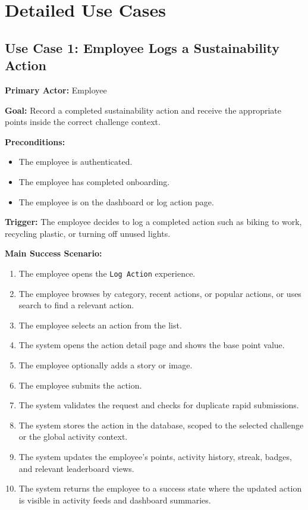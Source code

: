 \documentclass[12pt]{article}
\begin{document}
\section{Detailed Use Cases}

\subsection{Use Case 1: Employee Logs a Sustainability Action}

\textbf{Primary Actor:} Employee

\textbf{Goal:} Record a completed sustainability action and receive the
appropriate points inside the correct challenge context.

\textbf{Preconditions:}
\begin{itemize}[leftmargin=1.5em]
    \item The employee is authenticated.
    \item The employee has completed onboarding.
    \item The employee is on the dashboard or log action page.
\end{itemize}

\textbf{Trigger:} The employee decides to log a completed action such as biking
to work, recycling plastic, or turning off unused lights.

\textbf{Main Success Scenario:}
\begin{enumerate}[leftmargin=1.8em]
    \item The employee opens the \texttt{Log Action} experience.
    \item The employee browses by category, recent actions, or popular actions,
    or uses search to find a relevant action.
    \item The employee selects an action from the list.
    \item The system opens the action detail page and shows the base point
    value.
    \item The employee optionally adds a story or image.
    \item The employee submits the action.
    \item The system validates the request and checks for duplicate rapid
    submissions.
    \item The system stores the action in the database, scoped to the selected
    challenge or the global activity context.
    \item The system updates the employee's points, activity history, streak,
    badges, and relevant leaderboard views.
    \item The system returns the employee to a success state where the updated
    action is visible in activity feeds and dashboard summaries.
\end{enumerate}
\end{document}
